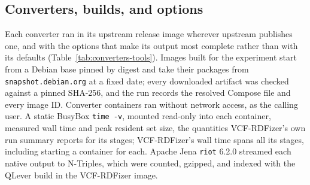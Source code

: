 \documentclass[11pt]{article}
\begin{document}
\subsection{Converters, builds, and options}\label{subsec:converters-tools}
Each converter ran in its upstream release image wherever upstream publishes one, and with the options that make its output most complete rather than with its defaults (Table~\ref{tab:converters-tools}).
Images built for the experiment start from a Debian base pinned by digest and take their packages from \texttt{snapshot.debian.org} at a fixed date; every downloaded artifact was checked against a pinned SHA-256, and the run records the resolved Compose file and every image ID.
Converter containers ran without network access, as the calling user.
A static BusyBox \texttt{time -v}, mounted read-only into each container, measured wall time and peak resident set size, the quantities VCF-RDFizer's own run summary reports for its stages; VCF-RDFizer's wall time spans all its stages, including starting a container for each.
Apache Jena \texttt{riot} 6.2.0 streamed each native output to N-Triples, which were counted, gzipped, and indexed with the QLever build in the VCF-RDFizer image.
\end{document}
